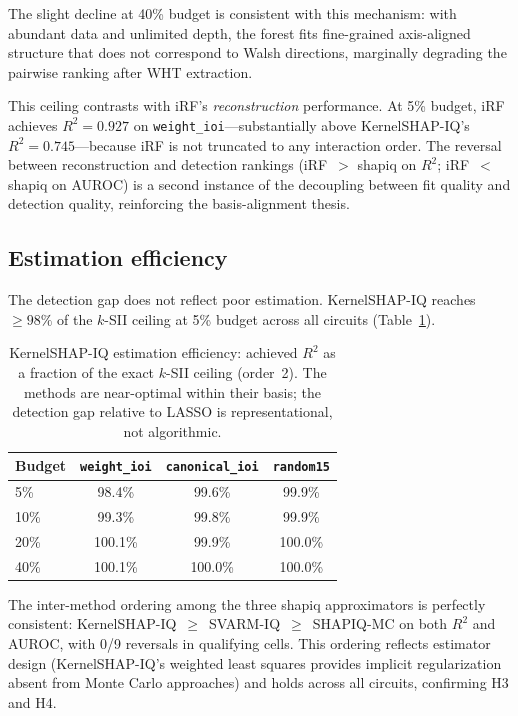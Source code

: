 \documentclass[11pt]{article}
\begin{document}
The slight decline at 40\% budget is consistent with this mechanism:
with abundant data and unlimited depth, the forest fits fine-grained
axis-aligned structure that does not correspond to Walsh directions,
marginally degrading the pairwise ranking after WHT extraction.

This ceiling contrasts with iRF's \emph{reconstruction} performance.
At 5\% budget, iRF achieves $R^2 = 0.927$ on
\texttt{weight\_ioi}---substantially above KernelSHAP-IQ's
$R^2 = 0.745$---because iRF is not truncated to any interaction
order. The reversal between reconstruction and detection rankings
(iRF~$>$ shapiq on $R^2$; iRF~$<$ shapiq on AUROC) is a second
instance of the decoupling between fit quality and detection quality,
reinforcing the basis-alignment thesis.


\subsection{Estimation efficiency}
\label{sec:efficiency}

The detection gap does not reflect poor estimation.
KernelSHAP-IQ reaches $\geq 98\%$ of the $k$-SII ceiling at 5\%
budget across all circuits (Table~\ref{tab:efficiency}).

\begin{table}[t]
\centering
\caption{KernelSHAP-IQ estimation efficiency: achieved $R^2$ as a
fraction of the exact $k$-SII ceiling (order~2). The methods are
near-optimal within their basis; the detection gap relative to
LASSO is representational, not algorithmic.}
\label{tab:efficiency}
\begin{tabular}{lccc}
\toprule
Budget & \texttt{weight\_ioi} & \texttt{canonical\_ioi} & \texttt{random15} \\
\midrule
5\%  & 98.4\% & 99.6\% & 99.9\% \\
10\% & 99.3\% & 99.8\% & 99.9\% \\
20\% & 100.1\% & 99.9\% & 100.0\% \\
40\% & 100.1\% & 100.0\% & 100.0\% \\
\bottomrule
\end{tabular}
\end{table}

The inter-method ordering among the three shapiq approximators is
perfectly consistent: KernelSHAP-IQ~$\geq$~SVARM-IQ~$\geq$~SHAPIQ-MC
on both $R^2$ and AUROC, with 0/9 reversals in qualifying cells.
This ordering reflects estimator design
(KernelSHAP-IQ's weighted least squares provides implicit
regularization absent from Monte Carlo approaches) and holds across
all circuits, confirming H3 and H4.
\end{document}
